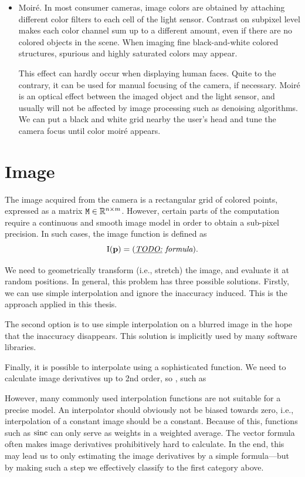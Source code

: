 \begin{itemize}
\item
Moiré.
In most consumer cameras, image colors are obtained by attaching different color filters to each cell of the light sensor.
Contrast on subpixel level makes each color channel sum up to a different amount, even if there are no colored objects in the scene.
When imaging fine black-and-white colored structures, spurious and highly saturated colors may appear.

This effect can hardly occur when displaying human faces.
Quite to the contrary, it can be used for manual focusing of the camera, if necessary.
Moiré is an optical effect between the imaged object and the light sensor, and usually will not be affected by image processing such as denoising algorithms.
We can put a black and white grid nearby the user's head and tune the camera focus until color moiré appears.

\end{itemize}

\section{Image}
\label{s.imagemodel}

The image acquired from the camera is a rectangular grid of colored points, expressed as a matrix $\mathtt{M} \in \mathbb{R}^{n\times m}$.
However, certain parts of the computation require a continuous and smooth image model in order to obtain a sub-pixel precision.
In such cases, the image function is defined as
$$\mathrm{I}(\mathbf{p}) = (\textit{\underline{TODO:} formula}).$$

We need to geometrically transform (i.e., stretch) the image, and evaluate it at random positions.
In general, this problem has three possible solutions.
Firstly, we can use simple interpolation and ignore the inaccuracy induced.
This is the approach applied in this thesis.

The second option is to use simple interpolation on a blurred image in the hope that the inaccuracy disappears.
This solution is implicitly used by many software libraries.

Finally, it is possible to interpolate using a sophisticated function.
We need to calculate image derivatives up to 2nd order, so , such as

However, many commonly used interpolation functions are not suitable for a precise model.
An interpolator should obviously not be biased towards zero, i.e., interpolation of a constant image should be a constant.
Because of this, functions such as $\mathrm{sinc}$ can only serve as weights in a weighted average.
The vector formula  often makes image derivatives prohibitively hard to calculate.
In the end, this may lead us to only estimating the image derivatives by a simple formula---but by making such a step we effectively classify to the first category above.

